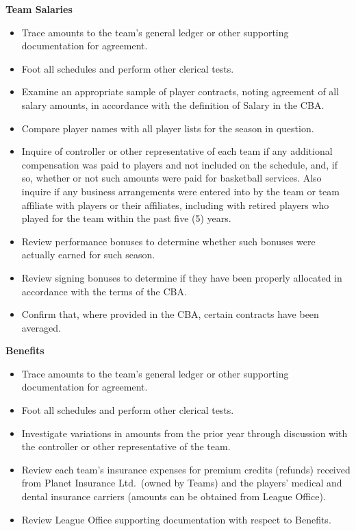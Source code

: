 \documentclass[
]{book}
\providecommand{\tightlist}{%
  \setlength{\itemsep}{0pt}\setlength{\parskip}{0pt}}
\begin{document}
\textbf{Team Salaries}

\begin{itemize}
\tightlist
\item
  Trace amounts to the team's general ledger or other supporting documentation for agreement.
\item
  Foot all schedules and perform other clerical tests.
\item
  Examine an appropriate sample of player contracts, noting agreement of all salary amounts, in accordance with the definition of Salary in the CBA.
\item
  Compare player names with all player lists for the season in question.
\item
  Inquire of controller or other representative of each team if any additional compensation was paid to players and not included on the schedule, and, if so, whether or not such amounts were paid for basketball services. Also inquire if any business arrangements were entered into by the team or team affiliate with players or their affiliates, including with retired players who played for the team within the past five (5) years.
\item
  Review performance bonuses to determine whether such bonuses were actually earned for such season.
\item
  Review signing bonuses to determine if they have been properly allocated in accordance with the terms of the CBA.
\item
  Confirm that, where provided in the CBA, certain contracts have been averaged.
\end{itemize}

\textbf{Benefits}

\begin{itemize}
\tightlist
\item
  Trace amounts to the team's general ledger or other supporting documentation for agreement.
\item
  Foot all schedules and perform other clerical tests.
\item
  Investigate variations in amounts from the prior year through discussion with the controller or other representative of the team.
\item
  Review each team's insurance expenses for premium credits (refunds) received from Planet Insurance Ltd.~(owned by Teams) and the players' medical and dental insurance carriers (amounts can be obtained from League Office).
\item
  Review League Office supporting documentation with respect to Benefits.
\end{itemize}
\end{document}
